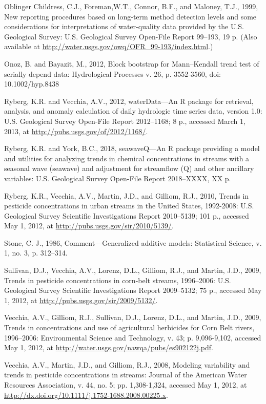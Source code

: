 \documentclass[11pt]{article}
\begin{document}
Oblinger Childress, C.J., Foreman,W.T., Connor, B.F., and Maloney, T.J., 1999, New reporting procedures based on long-term method detection levels and some considerations for interpretations of water-quality data provided by the U.S. Geological Survey: U.S. Geological Survey Open-File Report 99--193, 19 p. (Also available at \url{http://water.usgs.gov/owq/OFR_99-193/index.html}.)

Onoz, B. and Bayazit, M., 2012, Block bootstrap for Mann–Kendall trend test of serially depend data: Hydrological Processes v. 26, p. 3552-3560, doi: 10.1002/hyp.8438

Ryberg, K.R. and Vecchia, A.V., 2012, waterData---An R package for retrieval, analysis, and anomaly calculation of daily hydrologic time series data, version 1.0: U.S. Geological Survey Open-File Report 2012--1168; 8 p., accessed March 1, 2013, at \url{http://pubs.usgs.gov/of/2012/1168/}.

Ryberg, K.R. and York, B.C., 2018, seawaveQ---An R package providing a model and utilities for analyzing trends in chemical concentrations in streams with a seasonal wave (seawave) and adjustment for streamflow (Q) and other ancillary variables: U.S. Geological Survey Open-File Report 2018--XXXX, XX p. 

Ryberg, K.R., Vecchia, A.V., Martin, J.D., and Gilliom, R.J., 2010, Trends in pesticide concentrations in urban streams in the United States, 1992-2008: U.S. Geological Survey Scientific Investigations Report 2010--5139; 101 p.,  accessed May 1, 2012, at \url{http://pubs.usgs.gov/sir/2010/5139/}.

Stone, C. J., 1986, Comment—Generalized additive models: Statistical Science, v. 1, no. 3, p. 312–314.

Sullivan, D.J., Vecchia, A.V., Lorenz, D.L., Gilliom, R.J., and Martin, J.D., 2009, Trends in pesticide concentrations in corn-belt streams, 1996--2006: U.S. Geological Survey Scientific Investigations Report 2009--5132; 75 p.,  accessed May 1, 2012, at \url{http://pubs.usgs.gov/sir/2009/5132/}.

Vecchia, A.V., Gilliom, R.J., Sullivan, D.J., Lorenz, D.L., and Martin, J.D., 2009, Trends in concentrations and use of agricultural herbicides for Corn Belt rivers, 1996--2006:  Environmental Science and Technology, v. 43; p. 9,096-9,102, accessed May 1, 2012, at \url{http://water.usgs.gov/nawqa/pubs/es902122j.pdf}.

Vecchia, A.V., Martin, J.D., and Gilliom, R.J., 2008, Modeling variability and trends in pesticide concentrations in streams: Journal of the American Water Resources Association, v. 44, no. 5; pp. 1,308-1,324, accessed May 1, 2012, at \url{http://dx.doi.org/10.1111/j.1752-1688.2008.00225.x}.
\end{document}
